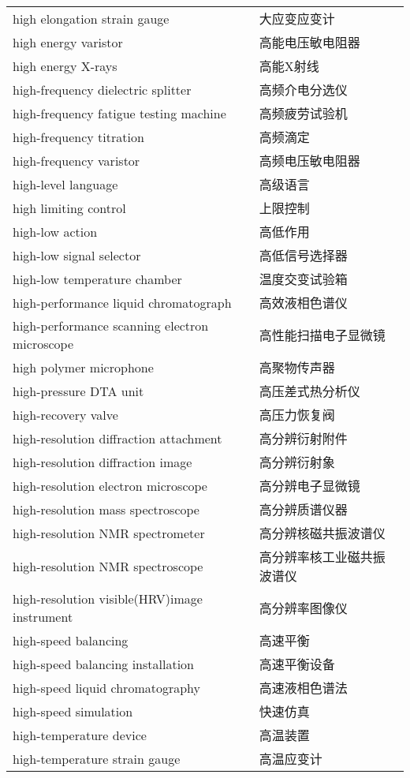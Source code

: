 \documentclass[
]{article}
\begin{document}
\begin{longtable}[]{@{}ll@{}}
high elongation strain gauge & 大应变应变计 \\
high energy varistor & 高能电压敏电阻器 \\
high energy X-rays & 高能X射线 \\
high-frequency dielectric splitter & 高频介电分选仪 \\
high-frequency fatigue testing machine & 高频疲劳试验机 \\
high-frequency titration & 高频滴定 \\
high-frequency varistor & 高频电压敏电阻器 \\
high-level language & 高级语言 \\
high limiting control & 上限控制 \\
high-low action & 高低作用 \\
high-low signal selector & 高低信号选择器 \\
high-low temperature chamber & 温度交变试验箱 \\
high-performance liquid chromatograph & 高效液相色谱仪 \\
high-performance scanning electron microscope & 高性能扫描电子显微镜 \\
high polymer microphone & 高聚物传声器 \\
high-pressure DTA unit & 高压差式热分析仪 \\
high-recovery valve & 高压力恢复阀 \\
high-resolution diffraction attachment & 高分辨衍射附件 \\
high-resolution diffraction image & 高分辨衍射象 \\
high-resolution electron microscope & 高分辨电子显微镜 \\
high-resolution mass spectroscope & 高分辨质谱仪器 \\
high-resolution NMR spectrometer & 高分辨核磁共振波谱仪 \\
high-resolution NMR spectroscope & 高分辨率核工业磁共振波谱仪 \\
high-resolution visible(HRV)image instrument & 高分辨率图像仪 \\
high-speed balancing & 高速平衡 \\
high-speed balancing installation & 高速平衡设备 \\
high-speed liquid chromatography & 高速液相色谱法 \\
high-speed simulation & 快速仿真 \\
high-temperature device & 高温装置 \\
high-temperature strain gauge & 高温应变计 \\

\end{longtable}
\end{document}
